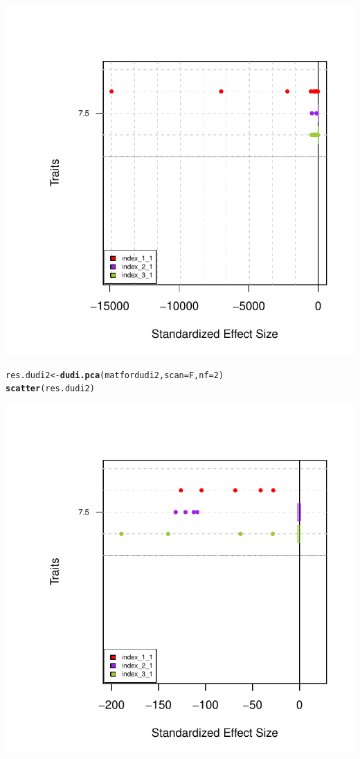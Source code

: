 \documentclass[12pt]{article}\usepackage[]{graphicx}\usepackage[]{color}
\makeatletter
\def\maxwidth{ %
  \ifdim\Gin@nat@width>\linewidth
    \linewidth
  \else
    \Gin@nat@width
  \fi
}
\newcommand{\hlnum}[1]{\textcolor[rgb]{0.686,0.059,0.569}{#1}}%
\newcommand{\hlstd}[1]{\textcolor[rgb]{0.345,0.345,0.345}{#1}}%
\newcommand{\hlkwb}[1]{\textcolor[rgb]{0.69,0.353,0.396}{#1}}%
\newcommand{\hlkwc}[1]{\textcolor[rgb]{0.333,0.667,0.333}{#1}}%
\newcommand{\hlkwd}[1]{\textcolor[rgb]{0.737,0.353,0.396}{\textbf{#1}}}%
\newenvironment{kframe}{%
 \def\at@end@of@kframe{}%
 \ifinner\ifhmode%
  \def\at@end@of@kframe{\end{minipage}}%
  \begin{minipage}{\columnwidth}%
 \fi\fi%
 \def\FrameCommand##1{\hskip\@totalleftmargin \hskip-\fboxsep
 \colorbox{shadecolor}{##1}\hskip-\fboxsep
     \hskip-\linewidth \hskip-\@totalleftmargin \hskip\columnwidth}%
 \MakeFramed {\advance\hsize-\width
   \@totalleftmargin\z@ \linewidth\hsize
   \@setminipage}}%
 {\par\unskip\endMakeFramed%
 \at@end@of@kframe}
\newenvironment{knitrout}{}{} %
\makeatother
\begin{document}
\begin{knitrout}
\includegraphics[width=\maxwidth]{figure/unnamed-chunk-581} 
\begin{kframe}\begin{alltt}
\hlstd{res.dudi2}\hlkwb{<-}\hlkwd{dudi.pca}\hlstd{(matfordudi2,} \hlkwc{scan}\hlstd{=F,} \hlkwc{nf}\hlstd{=}\hlnum{2}\hlstd{)}
\hlkwd{scatter}\hlstd{(res.dudi2)}
\end{alltt}
\end{kframe}
\includegraphics[width=\maxwidth]{figure/unnamed-chunk-582} 

\end{knitrout}
\end{document}
